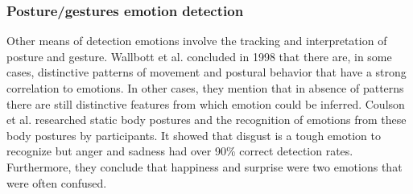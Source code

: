 \documentclass{sigchi}
\begin{document}
\subsubsection{Posture/gestures emotion detection}
Other means of detection emotions involve the tracking and interpretation of posture and gesture. Wallbott et al. \cite{Wallbott1998} concluded in 1998 that there are, in some cases, distinctive patterns of movement and postural behavior that have a strong correlation to emotions. In other cases, they mention that in absence of patterns there are still distinctive features from which emotion could be inferred. Coulson et al. \cite{Coulson2004} researched static body postures and the recognition of emotions from these body postures by participants. It showed that disgust is a tough emotion to recognize but anger and sadness had over 90\% correct detection rates. Furthermore, they conclude that happiness and surprise were two emotions that were often confused. 
\end{document}

